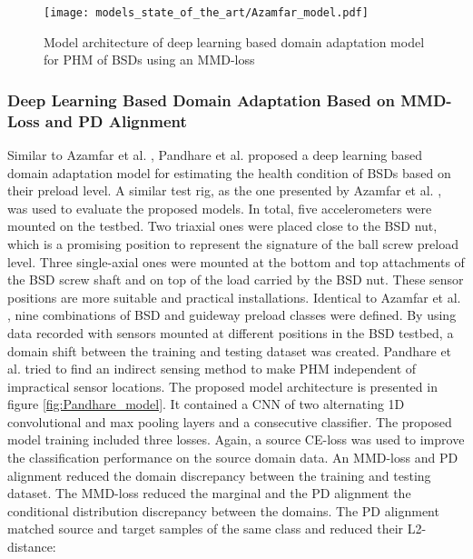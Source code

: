\begin{figure}[H]
  \centering
  \texttt{[image: models\_state\_of\_the\_art/Azamfar\_model.pdf]}
  \caption{Model architecture of deep learning based domain adaptation model for PHM of BSDs using an MMD-loss \cite{AZAMFAR2020103932}}
  \label{fig:Azamfar_model}
\end{figure}


\subsubsection{Deep Learning Based Domain Adaptation Based on MMD-Loss and PD Alignment}
Similar to Azamfar et al. \cite{AZAMFAR2020103932}, Pandhare et al. \cite{Pandhare2021} proposed a deep learning based domain adaptation model for estimating the health condition of BSDs based on their preload level. A similar test rig, as the one presented by Azamfar et al. \cite{AZAMFAR2020103932}, was used to evaluate the proposed models. In total, five accelerometers were mounted on the testbed. Two triaxial ones were placed close to the BSD nut, which is a promising position to represent the signature of the ball screw preload level. Three single-axial ones were mounted at the bottom and top attachments of the BSD screw shaft and on top of the load carried by the BSD nut. These sensor positions are more suitable and practical installations. Identical to Azamfar et al. \cite{AZAMFAR2020103932}, nine combinations of BSD and guideway preload classes were defined. By using data recorded with sensors mounted at different positions in the BSD testbed, a domain shift between the training and testing dataset was created. Pandhare et al. \cite{Pandhare2021} tried to find an indirect sensing method to make PHM independent of impractical sensor locations. The proposed model architecture is presented in figure \ref{fig:Pandhare_model}. It contained a CNN of two alternating 1D convolutional and max pooling layers and a consecutive classifier. The proposed model training included three losses. Again, a source CE-loss was used to improve the classification performance on the source domain data. An MMD-loss and PD alignment reduced the domain discrepancy between the training and testing dataset. The MMD-loss reduced the marginal and the PD alignment the conditional distribution discrepancy between the domains. The PD alignment matched source and target samples of the same class and reduced their L2-distance: 

